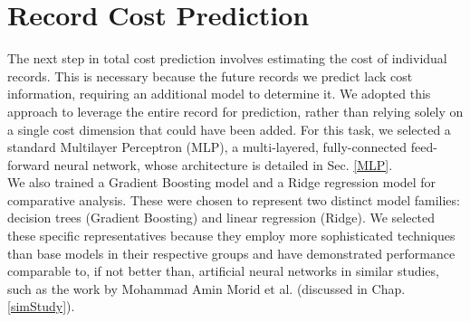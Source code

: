 
\section{Record Cost Prediction}
\label{recCostPred}

The next step in total cost prediction involves estimating the cost of individual records. This is necessary because the future records we predict lack cost information, requiring an additional model to determine it. We adopted this approach to leverage the entire record for prediction, rather than relying solely on a single cost dimension that could have been added. For this task, we selected a standard Multilayer Perceptron (MLP), a multi-layered, fully-connected feed-forward neural network, whose architecture is detailed in Sec. \ref{MLP}.
\\

We also trained a Gradient Boosting model and a Ridge regression model for comparative analysis. These were chosen to represent two distinct model families: decision trees (Gradient Boosting) and linear regression (Ridge). We selected these specific representatives because they employ more sophisticated techniques than base models in their respective groups and have demonstrated performance comparable to, if not better than, artificial neural networks in similar studies, such as the work by Mohammad Amin Morid et al. \cite{morid2018supervised} (discussed in Chap. \ref{simStudy}).